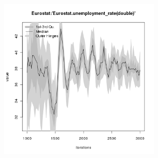 \begin{figure}[ht!]
\begin{minipage}{17cm}
\includegraphics[width=8cm]{./energy_shock/png/duration_240/intensity_0.05/frequency_20/Eurostat-unemployment_rate.png}
\end{minipage}
\end{figure}

